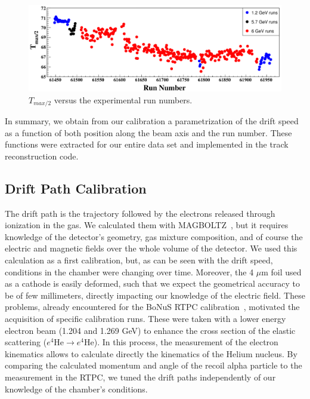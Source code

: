 \documentclass[preprint,5p]{elsarticle}
\begin{document}
\begin{figure}[tb]
\centering
\includegraphics[width=15.5cm]{Drift_run_number.pdf}
\caption{$T_{max/2}$ versus the experimental run numbers.} 
\label{fig:Drift_run_number_1}
\end{figure}

In summary, we obtain from our calibration a parametrization of the drift speed 
as a function of both position along the beam axis and the run number.  These 
functions were extracted for our entire data set and implemented in the track 
reconstruction code.
   
\subsection{Drift Path Calibration}

The drift path is the trajectory followed by the electrons released through 
ionization in the gas. We calculated them with
MAGBOLTZ~\cite{Biagi:1999nwa}, but it requires knowledge of the detector's 
geometry, gas mixture composition, and of course the electric and magnetic 
fields over the whole volume of the detector. We used this calculation as a 
first calibration, but, as can be seen with the drift speed, conditions in the 
chamber were changing over time. Moreover, the 4 $\mu$m foil used as a cathode 
is easily deformed, such that we expect the geometrical accuracy to be of few 
millimeters, directly impacting our knowledge of the electric field. These 
problems, already encountered for the BoNuS RTPC 
calibration~\cite{Fenker:2008zz}, motivated the acquisition of specific 
calibration runs. These were taken with a lower energy electron beam (1.204 and 
1.269 GeV) to enhance the cross section of the elastic scattering 
($e^{4}$He$\rightarrow e^{4}$He). In this process, the measurement of
the electron kinematics allows to calculate directly the kinematics of the Helium nucleus. 
By comparing the calculated momentum and angle of the recoil alpha particle to the 
measurement in the RTPC, we tuned the drift paths independently of our 
knowledge of the chamber's conditions.
\end{document}
